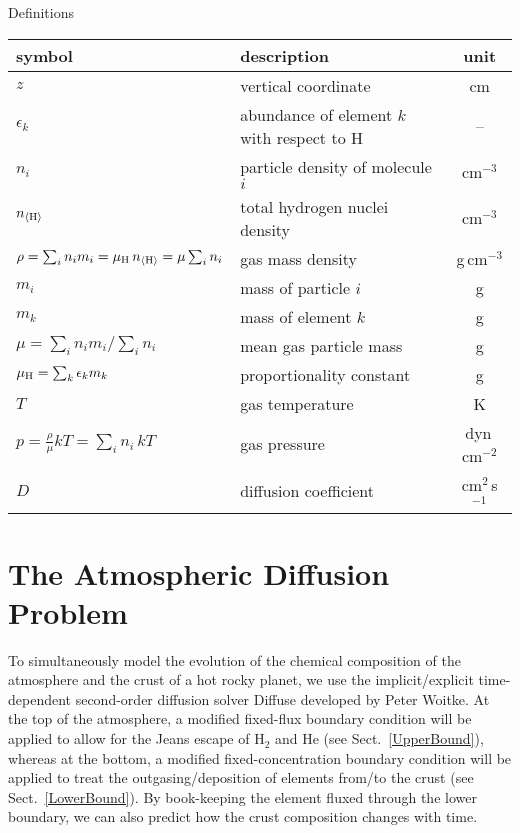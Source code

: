 \documentclass[11pt]{article}
\def\nH{n_{\langle\rm H\rangle}}
\def\ek{\epsilon_k}
\begin{document}
\centerline{Definitions}

\begin{tabular}{l|l|c}
\hline
symbol  & description & unit\\
\hline
$z$                       & vertical coordinate    & cm\\
$\ek$                     & abundance of element $k$ 
                            with respect to H      & --\\
$n_i$                     & particle density of molecule $i$ & cm$^{-3}$\\
$\nH$                     & total hydrogen nuclei density & cm$^{-3}$\\
$\rho = \sum_i n_i m_i = \mu_{\rm H}\,\nH = \mu \sum_i n_i$  
                          & gas mass density       & g\,cm$^{-3}$\\
$m_i$                     & mass of particle $i$   & g\\
$m_k$                     & mass of element $k$    & g\\
$\mu = {\sum_i n_i m_i}\Big/{\sum_i n_i}$ 
                          & mean gas particle mass & g\\
$\mu_{\rm H} = \sum_k \epsilon_k m_k$   
                          & proportionality constant & g\\
$T$                       & gas temperature        & K\\
$p = \frac{\rho}{\mu}kT = \sum_i n_i\,kT$  
                          & gas pressure           & dyn\,cm$^{-2}$\\
$D$                       & diffusion coefficient  & cm$^2$\,s$^{-1}$\\
\hline  
\end{tabular}

\bigskip
\section{The Atmospheric Diffusion Problem}

To simultaneously model the evolution of the chemical composition of
the atmosphere and the crust of a hot rocky planet, we use the
implicit/explicit time-dependent second-order diffusion solver {\sc
  Diffuse} developed by Peter Woitke.  At the top of the atmosphere, a
modified fixed-flux boundary condition will be applied to allow for
the Jeans escape of H$_2$ and He (see Sect.~\ref{UpperBound}), whereas
at the bottom, a modified fixed-concentration boundary condition will
be applied to treat the outgasing/deposition of elements from/to the
crust (see Sect.~\ref{LowerBound}). By book-keeping the element fluxed
through the lower boundary, we can also predict how the crust
composition changes with time.
 
\end{document}
